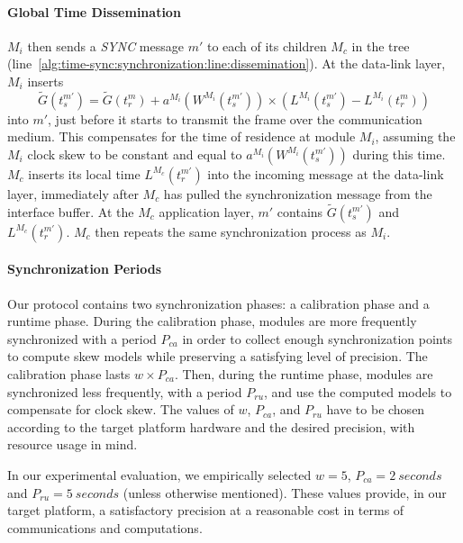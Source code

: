 \paragraph{Global Time Dissemination}

${M_i}$ then sends a \textit{SYNC} message $m'$ to each of its children ${M_c}$ in the tree (line~\ref{alg:time-sync:synchronization:line:dissemination}). At the data-link layer, ${M_i}$ inserts 
\begin{equation}\tilde{G}(t_s^{m'}) = \tilde{G}(t_r^{m}) + a^{M_i}\left(W^{M_i}\left(t_s^{m'}\right)\right)\times \left(L^{M_i}\left(t_s^{m'}\right) - L^{M_i}\left(t_r^{m}\right)\right)
\end{equation} into $m'$, just before it starts to transmit the frame over the communication medium. This compensates for the time of residence at module ${M_i}$, assuming the ${M_i}$ clock skew to be constant and equal to $a^{M_i}(W^{M_i}(t_s^{m'}))$ during this time. ${M_c}$ inserts its local time $L^{M_c}(t_r^{m'})$ into the incoming message at the data-link layer, immediately after $M_c$ has pulled the synchronization message from the interface buffer. At the ${M_c}$ application layer, $m'$ contains $\tilde{G}(t_s^{m'})$ and $L^{M_c}(t_r^{m'})$. ${M_c}$ then repeats the same synchronization process as ${M_i}$.

\paragraph{Synchronization Periods}


Our protocol contains two synchronization phases: a calibration phase and a runtime phase. During the calibration phase, modules are more frequently synchronized with a period $P_{ca}$ in order to collect enough synchronization points to compute skew models while preserving a satisfying level of precision. The calibration phase lasts $w\times P_{ca}$. Then, during the runtime phase, modules are synchronized less frequently, with a period $P_{ru}$, and use the computed models to compensate for clock skew. The values of $w$, $P_{ca}$, and $P_{ru}$ have to be chosen according to the target platform hardware and the desired precision, with resource usage in mind.

In our experimental evaluation, we empirically selected $w = 5$, $P_{ca} = 2\ seconds$ and $P_{ru} = 5\ seconds$ (unless otherwise mentioned). These values provide, in our target platform, a satisfactory precision at a reasonable cost in terms of communications and computations.

